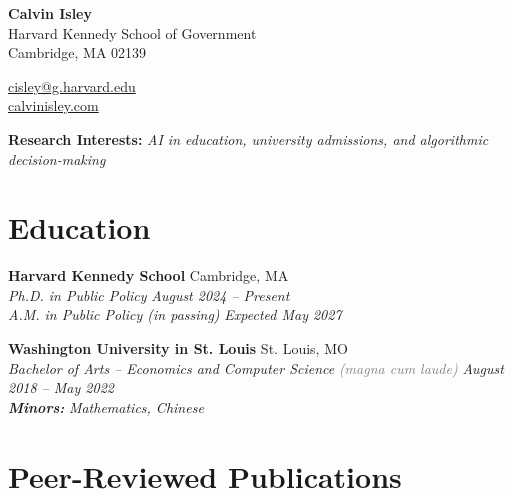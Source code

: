 \documentclass[11pt]{article}
\newcommand{\entrysep}{\vspace{4pt}}
\begin{document}
\pagestyle{empty}

\begin{minipage}[t]{0.60\textwidth}
  {\huge\textbf{Calvin Isley}}\\[3pt]
  Harvard Kennedy School of Government\\
  Cambridge, MA 02139
\end{minipage}%
\begin{minipage}[t]{0.40\textwidth}
  \raggedleft
  \href{mailto:cisley@g.harvard.edu}{cisley@g.harvard.edu}\\[2pt]
  \href{https://calvinisley.com}{calvinisley.com}
\end{minipage}

\vspace{5pt}
\textbf{Research Interests:} \textit{AI in education, university admissions, and algorithmic decision-making}

\section*{Education}

\textbf{Harvard Kennedy School} \hfill Cambridge, MA\\
\textit{Ph.D. in Public Policy} \hfill \textit{August 2024 -- Present}\\
\textit{A.M. in Public Policy (in passing)} \hfill \textit{Expected May 2027}

\entrysep

\textbf{Washington University in St. Louis} \hfill St. Louis, MO\\
\textit{Bachelor of Arts -- Economics and Computer Science} \textcolor{gray}{\textit{(magna cum laude)}} \hfill \textit{August 2018 -- May 2022}\\
\textbf{\textit{Minors:}} \textit{Mathematics, Chinese}

\section*{Peer-Reviewed Publications}
\end{document}
